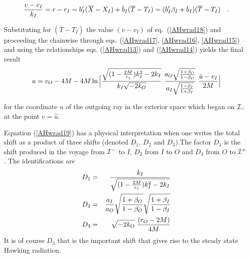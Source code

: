 \documentclass[12pt,oneside]{report}
\def\beq {\begin{equation}}
\def\feq {\end{equation}}
\begin{document}
{\beq  {v - v_I \over k_I} = r - r_I = b^\prime _I ( {\overline X} -
X_I) + {\dot b}_I ({\overline T} - T_I) = (b^\prime_I \beta_I + {\dot
b}_I) ({\overline T} - T_I)\quad . \label{AHwrad18} \feq



\noindent Substituting for $ ({\overline T} - T_I)$ the value $
(v - v_I)$ of eq.~(\ref{AHwrad18}) and proceeding the chainwise through eqs.
(\ref{AHwrad17}, \ref{AHwrad16}, \ref{AHwrad15}) and using the 
relationships eqs.
(\ref{AHwrad13})
 and (\ref{AHwrad14})
yields the final result
\beq u = v_O - 4M - 4M \ln 
\Big|   {\sqrt{(1 - {2M \over r_1}) k^2 _I - 2 k_I} \over k_I
\sqrt{-2 k_O}} \; {a_O \sqrt{1 + {\beta}_O \over 1 - {\beta}_O}
\over a_I \sqrt{1 - {\beta}_I \over 1 + {\beta}_I}} \;
 {\hat u - v_I \over 2M}\Big| \label{AHwrad19} \feq



\noindent for the coordinate $u$ of the outgoing ray in the
exterior space which began on $ {\cal I}_-$ at the point $ 
v = {\hat u}$.
\par\noindent Equation (\ref{AHwrad19}) has a physical interpretation when one
writes the total shift as a product of three shifts (denoted
 $D_1$, $ D_2$ and $ D_3$).The factor  $D_1 $ is 
the shift produced in the voyage
from $ {\cal I}^-$ to $I$, $ D_2 $ from $I$ to $O$ and $  D_3 $ from
$O$ to $ {\cal I}^+$. The identifications are
\begin{eqnarray}
  D_1 & = & {{k_I} \over {\sqrt {(1 -{2M \over r_I})k_I^2 - 2 k_I}}}
\nonumber \\
 D_2 & = & {a_I \over a_O} {\sqrt {{1 + {\beta}_O} \over 1 -
\beta_O}}{\sqrt {{1 + {\beta}_I} \over 1 -
\beta_I}}\nonumber \\
 D_3 & = & \sqrt {-2 k_O} \; {(r_O - 2M) \over 4M} \nonumber
\end{eqnarray} 
\noindent It is of course $  D_3 $ that is the important
shift that gives rise to the steady state Hawking radiation.

}
\end{document}
